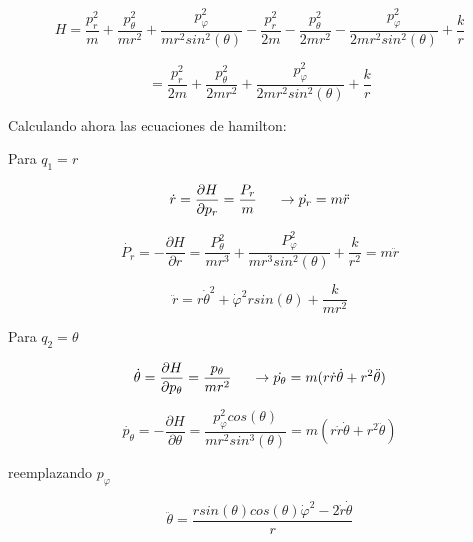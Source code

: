 \documentclass[12 pt]{article}
\begin{document}
\begin{equation*}
H = \frac{p_{r}^{2}}{m} + \frac{p_{\theta}^{2}}{mr^{2}} +\frac{p_{\varphi}^{2}}{mr^{2}sin^{2}(\theta)}- \frac{p_{r}^{2}}{2m} - \frac{p_{\theta}^{2}}{2mr^{2}}-\frac{p_{\varphi}^{2}}{2mr^{2}sin^{2}(\theta)}+ \frac{k}{r}
\end{equation*}

\begin{equation*}
= \frac{p_{r}^{2}}{2m} + \frac{p_{\theta}^{2}}{2mr^{2}}+\frac{p_{\varphi}^{2}}{2mr^{2}sin^{2}(\theta)}+ \frac{k}{r}
\end{equation*}


Calculando ahora las ecuaciones de hamilton:


Para $q_{1} = r$

\begin{equation*}
\dot{r}= \frac{\partial H}{\partial p_{r}} = \frac{P_{r}}{m} \hspace{0.5cm} \rightarrow \dot{p_{r}} = m \ddot{r}
\end{equation*}

\begin{equation*}
\dot{P_{r}} = - \frac{\partial H}{\partial r}= \frac{P_{\theta}^{2}}{m r^{3}} + \frac{P_{\varphi}^{2}}{m r^{3} sin^{2}(\theta)} + \frac{k}{r^{2}} = m \ddot{r}
\end{equation*}


\begin{equation*}
\ddot{r} = 	r\dot{\theta}^{2} + \dot{\varphi}^{2} r sin(\theta) + \frac{k}{m r^{2}}
\end{equation*}


Para $q_{2}= \theta$

\begin{equation*}
\dot{\theta} = \frac{\partial H }{ \partial p_{\theta}} = \frac{p_{\theta}}{mr^{2}} \hspace{0.5cm}\rightarrow \dot{p_{\theta}}= m(r\dot{r}\dot{\theta}+ r^{2}\ddot{\theta})
\end{equation*}

\begin{equation*}
\dot{p_{\theta}} = - \frac{\partial H}{\partial \theta} = \frac{p_{\varphi}^{2}cos(\theta)}{mr^{2}sin^{3}(\theta)} = m(r\dot{r}\dot{\theta}+ r^{2}\ddot{\theta})
\end{equation*}

reemplazando $p_{\varphi}$

\begin{equation*}
\ddot{\theta} = \dfrac{r sin(\theta)cos(\theta)\dot{\varphi}^{2}- 2 \dot{r}\dot{\theta}}{r}
\end{equation*}
\end{document}
